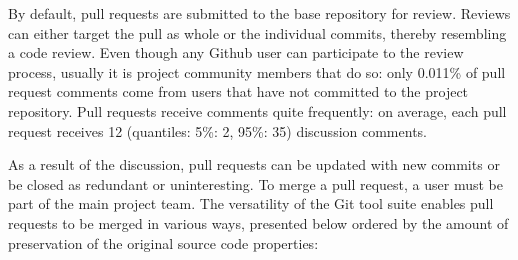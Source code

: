 \documentclass{sig-alternate}
\begin{document}
By default, pull requests are submitted to the base repository for review.
Reviews can either target the pull as whole or the individual commits,
thereby resembling a code review. 
Even though any Github user can participate to the
review process, usually it is project community members that do so:
only 0.011\% of pull request comments come from users that have not
committed to the project repository.
Pull requests receive comments quite frequently: on average, each pull
request receives 12 (quantiles: 5\%: 2, 95\%: 35) discussion comments.

As a result of the discussion, pull requests can be updated with new commits or
be closed as redundant or uninteresting. To merge a pull request, a user must
be part of the main project team. The versatility of the Git tool suite enables
pull requests to be merged in various ways, presented below ordered by
the amount of preservation of the original source code properties:
\end{document}
